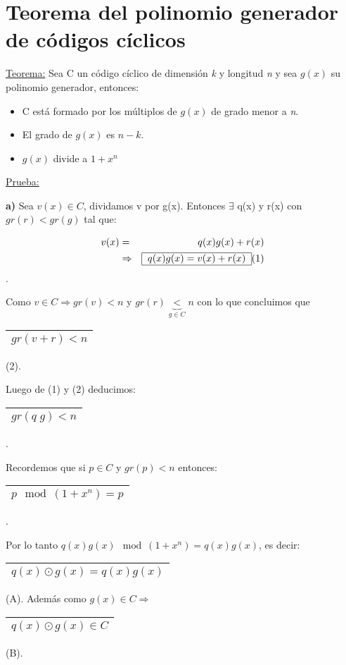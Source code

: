 \documentclass[12pt,a4paper]{report}
\begin{document}
	\section{Teorema del polinomio generador de códigos cíclicos}

		\underline{Teorema:} Sea C un código cíclico de dimensión \textit{k} y longitud \textit{n} y sea $g(x)$ su polinomio generador, entonces:

		\begin{itemize}
			\item C está formado por los múltiplos de $g(x)$ de grado menor a \textit{n}.
			\item El grado de $g(x)$ es $n-k$.
			\item $g(x)$ divide a $1+x^{n}$
		\end{itemize}

		\underline{Prueba:}

		\textbf{a)} Sea $v(x) \in C$, dividamos v por g(x). Entonces $\exists$ q(x) y r(x) con $gr(r) < gr(g)$ tal que:

		\begin{eqnarray}
			\nonumber v(x) &=& q(x) g(x) + r(x) \\
			\nonumber & \Rightarrow & \begin{tabular}{|c|} \hline $q(x) g(x) = v(x) + r(x) $ \\ \hline \end{tabular} (1)
		\end{eqnarray}.

		Como $v \in C \Rightarrow gr(v) < n$ y $gr(r) \underbrace{<}_{g \in C} n $ con lo que concluimos que  \begin{tabular}{|c|} \hline $gr(v + r) < n $ \\ \hline \end{tabular} (2).

		Luego de (1) y (2) deducimos: \begin{tabular}{|c|} \hline $gr(q \; g) < n $ \\ \hline \end{tabular}.

		\vspace{3mm}
		Recordemos que si $p \in C$ y $gr(p) < n$ entonces: \begin{tabular}{|c|} \hline $p \mod (1+ x^{n}) = p$ \\ \hline \end{tabular}.

		\vspace{3mm}
		Por lo tanto $q(x) g(x) \mod (1 + x^{n}) = q(x) g(x)$, es decir: \begin{tabular}{|c|} \hline $ q(x) \odot g(x) = q(x) g(x) $ \\ \hline \end{tabular} (A). Además como $g(x) \in C \Rightarrow$ \begin{tabular}{|c|} \hline $q(x) \odot g(x) \in C $ \\ \hline \end{tabular} (B).
\end{document}
